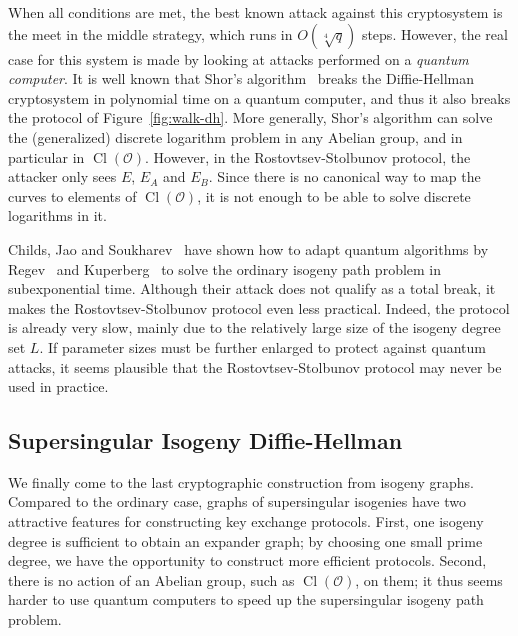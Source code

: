 \documentclass[10pt]{article}
\theoremstyle{plain}
\theoremstyle{definition}
\DeclareMathOperator{\Cl}{Cl}
\def\O{\ensuremath{\mathcal{O}}}
\begin{document}
When all conditions are met, the best known attack against this
cryptosystem is the meet in the middle strategy, which runs in
$O(\sqrt[4]{q})$ steps. %
However, the real case for this system is made by looking at attacks
performed on a \emph{quantum computer}. %
It is well known that Shor's algorithm~\cite{shor1994algorithms}
breaks the Diffie-Hellman cryptosystem in polynomial time on a quantum
computer, and thus it also breaks the protocol of
Figure~\ref{fig:walk-dh}. %
More generally, Shor's algorithm can solve the (generalized) discrete
logarithm problem in any Abelian group, and in particular in
$\Cl(\O)$. %
However, in the Rostovtsev-Stolbunov protocol, the attacker only sees
$E$, $E_A$ and $E_B$. %
Since there is no canonical way to map the curves to elements of
$\Cl(\O)$, it is not enough to be able to solve discrete logarithms in
it.

Childs, Jao and Soukharev~\cite{childs2014constructing} have shown how
to adapt quantum algorithms by Regev~\cite{regev04} and
Kuperberg~\cite{Kup} to solve the ordinary isogeny path problem in
subexponential time. %
Although their attack does not qualify as a total break, it makes the
Rostovtsev-Stolbunov protocol even less practical. %
Indeed, the protocol is already very slow, mainly due to the
relatively large size of the isogeny degree set $L$. %
If parameter sizes must be further enlarged to protect against quantum
attacks, it seems plausible that the Rostovtsev-Stolbunov protocol may
never be used in practice.


\subsection{Supersingular Isogeny Diffie-Hellman}

We finally come to the last cryptographic construction from isogeny
graphs. %
Compared to the ordinary case, graphs of supersingular isogenies have
two attractive features for constructing key exchange protocols. %
First, one isogeny degree is sufficient to obtain an expander graph;
by choosing one small prime degree, we have the opportunity to
construct more efficient protocols. %
Second, there is no action of an Abelian group, such as $\Cl(\O)$, on
them; it thus seems harder to use quantum computers to speed up the
supersingular isogeny path problem.
\end{document}
